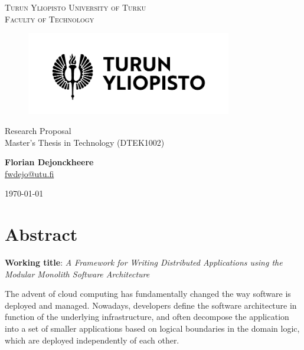 \documentclass[12pt]{article}
\makeatletter
\newcommand{\faculty}{Faculty of Technology}
\newcommand{\course}{Master's Thesis in Technology (DTEK1002)}
\newcommand{\documenttitle}{Research Proposal}
\newcommand{\authorname}{Florian Dejonckheere}
\newcommand{\authoremail}{fwdejo@utu.fi}
\newcommand{\documentdate}{\today}
\makeatother
\begin{document}
	\begin{titlepage}
		\begin{center}
			\textsc{Turun Yliopisto \textemdash \hspace{1mm} University of Turku} \\
			\textsc{\faculty}
		\end{center}
		\begin{figure}[h]
			\vspace{10mm}

			\centering\includegraphics[width=0.8\textwidth]{logo-fi}

			\vspace{20mm}\label{fig:logo}
		\end{figure}
		\begin{center}
			\fontsize{10mm}{7mm}\selectfont
			\textup{\documenttitle} \\
			\textnormal{\Large{\course}} \\

			\vspace{25mm}

			\large{\textbf{\authorname}} \\
			\large{\href{mailto:\authoremail}{\authoremail}} \\

			\vspace{35mm}

			\documentdate
		\end{center}
	\end{titlepage}

	\clearpage


	\section*{Abstract}\label{sec:abstract}

	\textbf{Working title}: \textit{A Framework for Writing Distributed Applications using the Modular Monolith Software Architecture}

	The advent of cloud computing has fundamentally changed the way software is deployed and managed.
	Nowadays, developers define the software architecture in function of the underlying infrastructure, and often decompose the application into a set of smaller applications based on logical boundaries in the domain logic, which are deployed independently of each other.
\end{document}
